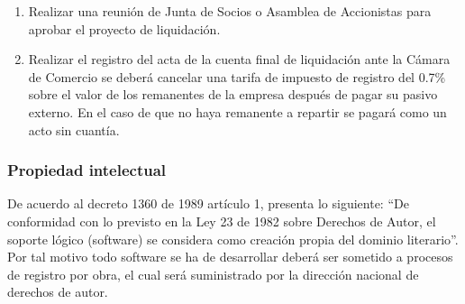 \begin{enumerate}
    \item Realizar una reunión de Junta de Socios o Asamblea de Accionistas para aprobar el proyecto de liquidación.
    
    \item Realizar el registro del acta de la cuenta final de liquidación ante la Cámara de Comercio se deberá cancelar una tarifa de impuesto de registro del 0.7\% sobre el valor de los remanentes de la empresa después de pagar su pasivo externo. En el caso de que no haya remanente a repartir se pagará como un acto sin cuantía.
    
\end{enumerate}

\subsubsection*{Propiedad intelectual}

De acuerdo al decreto 1360 de 1989 artículo 1, presenta lo siguiente: “De conformidad con lo previsto en la Ley 23 de 1982 sobre Derechos de Autor, el soporte lógico (software) se considera como creación propia del dominio literario”. Por tal motivo todo software se ha de desarrollar deberá ser sometido a procesos de registro por obra, el cual será suministrado por la dirección nacional de derechos de autor.